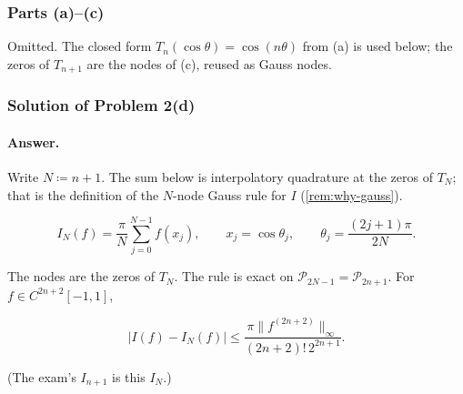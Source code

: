 \subsubsection{Parts (a)--(c)}

Omitted. The closed form \(T_{n}(\cos\theta)=\cos(n\theta)\) from (a) is used below; the zeros of \(T_{n+1}\) are the nodes of (c), reused as Gauss nodes.

\subsubsection{Solution of Problem 2(d)}

\paragraph{Answer.}
Write \(N\coloneqq n+1\). The sum below is interpolatory quadrature at the zeros of \(T_{N}\); that is the definition of the \(N\)-node Gauss rule for \(I\) (\cref{rem:why-gauss}).

\begin{equation}
\label{eq:p2d-formula}
I_{N}(f)
=
\frac{\pi}{N}
\sum_{j=0}^{N-1}
f(x_{j}),
\qquad
x_{j}
=
\cos\theta_{j},
\qquad
\theta_{j}
=
\frac{(2j+1)\pi}{2N}.
\end{equation}

The nodes are the zeros of \(T_{N}\). The rule is exact on \(\mathcal{P}_{2N-1}=\mathcal{P}_{2n+1}\). For \(f\in C^{2n+2}[-1,1]\),

\[
\bigl|I(f)-I_{N}(f)\bigr|
\le
\frac{\pi\|f^{(2n+2)}\|_{\infty}}{(2n+2)!\,2^{2n+1}}.
\]

(The exam's \(I_{n+1}\) is this \(I_{N}\).)

